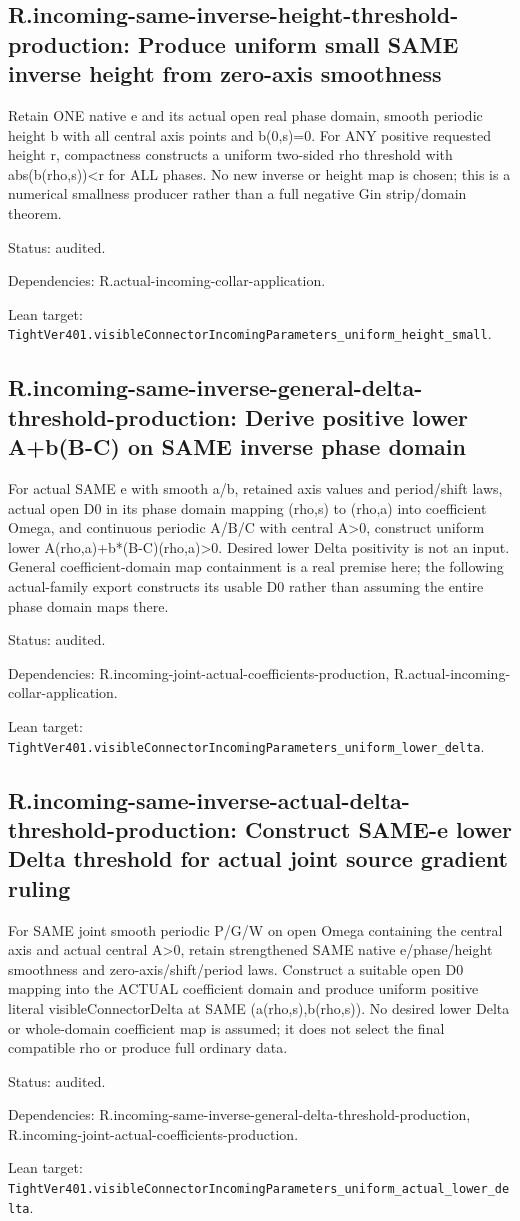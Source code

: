 \documentclass{article}
\begin{document}
\subsection*{R.incoming-same-inverse-height-threshold-production: Produce uniform small SAME inverse height from zero-axis smoothness}
Retain ONE native e and its actual open real phase domain, smooth periodic height b with all central axis points and b(0,s)=0. For ANY positive requested height r, compactness constructs a uniform two-sided rho threshold with abs(b(rho,s))<r for ALL phases. No new inverse or height map is chosen; this is a numerical smallness producer rather than a full negative Gin strip/domain theorem.
\par Status: audited.
\par Dependencies: R.actual-incoming-collar-application.
\par Lean target: \texttt{TightVer401.visibleConnectorIncomingParameters\_uniform\_height\_small}.
\subsection*{R.incoming-same-inverse-general-delta-threshold-production: Derive positive lower A+b(B-C) on SAME inverse phase domain}
For actual SAME e with smooth a/b, retained axis values and period/shift laws, actual open D0 in its phase domain mapping (rho,s) to (rho,a) into coefficient Omega, and continuous periodic A/B/C with central A>0, construct uniform lower A(rho,a)+b*(B-C)(rho,a)>0. Desired lower Delta positivity is not an input. General coefficient-domain map containment is a real premise here; the following actual-family export constructs its usable D0 rather than assuming the entire phase domain maps there.
\par Status: audited.
\par Dependencies: R.incoming-joint-actual-coefficients-production, R.actual-incoming-collar-application.
\par Lean target: \texttt{TightVer401.visibleConnectorIncomingParameters\_uniform\_lower\_delta}.
\subsection*{R.incoming-same-inverse-actual-delta-threshold-production: Construct SAME-e lower Delta threshold for actual joint source gradient ruling}
For SAME joint smooth periodic P/G/W on open Omega containing the central axis and actual central A>0, retain strengthened SAME native e/phase/height smoothness and zero-axis/shift/period laws. Construct a suitable open D0 mapping into the ACTUAL coefficient domain and produce uniform positive literal visibleConnectorDelta at SAME (a(rho,s),b(rho,s)). No desired lower Delta or whole-domain coefficient map is assumed; it does not select the final compatible rho or produce full ordinary data.
\par Status: audited.
\par Dependencies: R.incoming-same-inverse-general-delta-threshold-production, R.incoming-joint-actual-coefficients-production.
\par Lean target: \texttt{TightVer401.visibleConnectorIncomingParameters\_uniform\_actual\_lower\_delta}.
\end{document}
